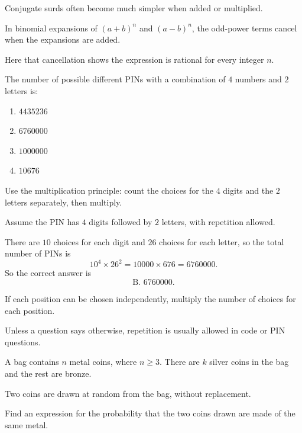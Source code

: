 \begin{takeaways}
\item Conjugate surds often become much simpler when added or multiplied.
\item In binomial expansions of $(a+b)^n$ and $(a-b)^n$, the odd-power terms cancel when the expansions are added.
\item Here that cancellation shows the expression is rational for every integer $n$.
\end{takeaways}

\begin{problem}
The number of possible different PINs with a combination of $4$ numbers and $2$ letters is:
\begin{enumerate}[label=\Alph*.]
\item $4435236$
\item $6760000$
\item $1000000$
\item $10676$
\end{enumerate}
\end{problem}

\begin{hint}
Use the multiplication principle: count the choices for the $4$ digits and the $2$ letters separately, then multiply.
\end{hint}

\begin{solution}
Assume the PIN has $4$ digits followed by $2$ letters, with repetition allowed.

There are $10$ choices for each digit and $26$ choices for each letter, so the total number of PINs is
\[
10^4 \times 26^2 = 10000 \times 676 = 6760000.
\]
So the correct answer is
\[
\boxed{\text{B. }6760000}.
\]
\end{solution}

\begin{takeaways}
\item If each position can be chosen independently, multiply the number of choices for each position.
\item Unless a question says otherwise, repetition is usually allowed in code or PIN questions.
\end{takeaways}

\begin{problem}
A bag contains $n$ metal coins, where $n \ge 3$. There are $k$ silver coins in the bag and the rest are bronze.

Two coins are drawn at random from the bag, without replacement.

Find an expression for the probability that the two coins drawn are made of the same metal.
\end{problem}

